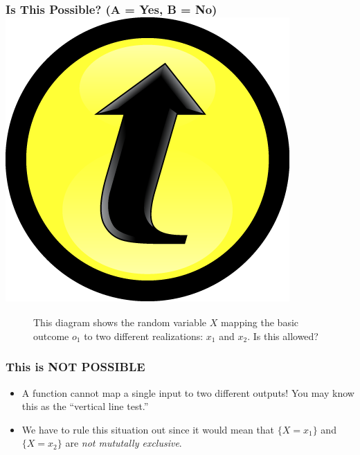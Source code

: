 \documentclass[handout]{beamer}
\begin{document}
\begin{frame}
\frametitle{Is This Possible? (A = Yes, B = No) \hfill \includegraphics[scale = 0.05]{./images/clicker}}

\begin{figure}
\caption{This diagram shows the random variable $X$ mapping the basic outcome $o_1$ to two different realizations: $x_1$ and $x_2$. Is this allowed?}
\end{figure}

\end{frame}


\begin{frame}
\frametitle{This is NOT POSSIBLE}

\begin{figure}
\centering
{}
\end{figure}

\begin{itemize}
	\item A function cannot map a single input to two different outputs! You may know this as the ``vertical line test.''
	\item We have to rule this situation out since it would mean that $\{X = x_1\}$ and $\{X = x_2\}$ are \emph{not mututally exclusive}.
\end{itemize}

\end{frame}
\end{document}
